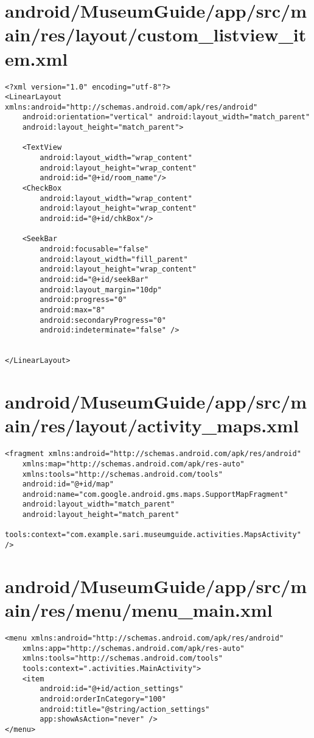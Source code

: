 \section{android/MuseumGuide/app/src/main/res/layout/custom_listview_item.xml}
\begin{lstlisting}<?xml version="1.0" encoding="utf-8"?>
<LinearLayout xmlns:android="http://schemas.android.com/apk/res/android"
    android:orientation="vertical" android:layout_width="match_parent"
    android:layout_height="match_parent">

    <TextView
        android:layout_width="wrap_content"
        android:layout_height="wrap_content"
        android:id="@+id/room_name"/>
    <CheckBox
        android:layout_width="wrap_content"
        android:layout_height="wrap_content"
        android:id="@+id/chkBox"/>

    <SeekBar
        android:focusable="false"
        android:layout_width="fill_parent"
        android:layout_height="wrap_content"
        android:id="@+id/seekBar"
        android:layout_margin="10dp"
        android:progress="0"
        android:max="8"
        android:secondaryProgress="0"
        android:indeterminate="false" />


</LinearLayout>
\end{lstlisting}
\newpage
\section{android/MuseumGuide/app/src/main/res/layout/activity_maps.xml}
\begin{lstlisting}<fragment xmlns:android="http://schemas.android.com/apk/res/android"
    xmlns:map="http://schemas.android.com/apk/res-auto"
    xmlns:tools="http://schemas.android.com/tools"
    android:id="@+id/map"
    android:name="com.google.android.gms.maps.SupportMapFragment"
    android:layout_width="match_parent"
    android:layout_height="match_parent"
    tools:context="com.example.sari.museumguide.activities.MapsActivity" />
\end{lstlisting}
\newpage
\section{android/MuseumGuide/app/src/main/res/menu/menu_main.xml}
\begin{lstlisting}<menu xmlns:android="http://schemas.android.com/apk/res/android"
    xmlns:app="http://schemas.android.com/apk/res-auto"
    xmlns:tools="http://schemas.android.com/tools"
    tools:context=".activities.MainActivity">
    <item
        android:id="@+id/action_settings"
        android:orderInCategory="100"
        android:title="@string/action_settings"
        app:showAsAction="never" />
</menu>
\end{lstlisting}
\newpage
